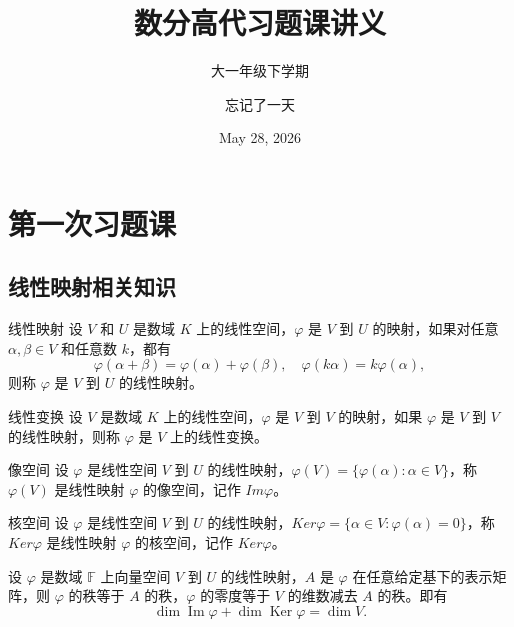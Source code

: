 \documentclass[lang=cn,12pt]{elegantbook}
\title{数分高代习题课讲义}
\subtitle{大一年级下学期 }
\author{忘记了一天}
\institute{XTU\_data\_2}
\date{May 28, 2026}
\begin{document}
\maketitle

\frontmatter

\tableofcontents

\mainmatter



\chapter{第一次习题课}

\section{线性映射相关知识}
\begin{definition}{线性映射}
    设 \(V\) 和 \(U\) 是数域 \(K\) 上的线性空间，\(\varphi\) 是 \(V\) 到 \(U\) 的映射，如果对任意 \(\alpha, \beta \in V\) 和任意数 \(k\)，都有
    \[
    \varphi(\alpha + \beta) = \varphi(\alpha) + \varphi(\beta), \quad \varphi(k\alpha) = k\varphi(\alpha),
    \]
    则称 \(\varphi\) 是 \(V\) 到 \(U\) 的线性映射。
\end{definition}

\begin{definition}{线性变换}
    设 \(V\) 是数域 \(K\) 上的线性空间，\(\varphi\) 是 \(V\) 到 \(V\) 的映射，如果 \(\varphi\) 是 \(V\) 到 \(V\) 的线性映射，则称 \(\varphi\) 是 \(V\) 上的线性变换。
\end{definition}

\begin{definition}{像空间}
    设 \(\varphi\) 是线性空间 \(V\) 到 \(U\) 的线性映射，\(\varphi(V) = \{\varphi(\alpha): \alpha \in V\}\)，称 \(\varphi(V)\) 是线性映射 \(\varphi\) 的像空间，记作 \(Im\varphi\)。
\end{definition}

\begin{definition}{核空间}
    设 \(\varphi\) 是线性空间 \(V\) 到 \(U\) 的线性映射，\(Ker\varphi = \{\alpha \in V: \varphi(\alpha) = 0\}\)，称 \(Ker\varphi\) 是线性映射 \(\varphi\) 的核空间，记作 \(Ker\varphi\)。
\end{definition}

\begin{theorem}
    设 \(\varphi\) 是数域 \(\mathbb{F}\) 上向量空间 \(V\) 到 \(U\) 的线性映射，\(A\) 是 \(\varphi\) 在任意给定基下的表示矩阵，则 \(\varphi\) 的秩等于 \(A\) 的秩，\(\varphi\) 的零度等于 \(V\) 的维数减去 \(A\) 的秩。即有
\[
\dim \operatorname{Im} \varphi + \dim \operatorname{Ker} \varphi = \dim V.
\]
\end{theorem}
\end{document}
